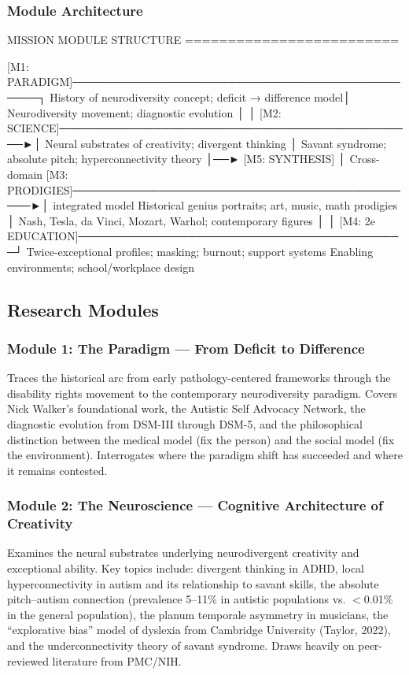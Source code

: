 \documentclass[11pt,letterpaper]{article}
\begin{document}
\subsubsection{Module Architecture}

\begin{asciibox}
MISSION MODULE STRUCTURE
=========================

  [M1: PARADIGM]──────────────────────────────────────────────┐
  History of neurodiversity concept; deficit → difference model│
  Neurodiversity movement; diagnostic evolution                │
                                                               │
  [M2: SCIENCE]──────────────────────────────────────────────►│
  Neural substrates of creativity; divergent thinking          │
  Savant syndrome; absolute pitch; hyperconnectivity theory    │──► [M5: SYNTHESIS]
                                                               │    Cross-domain
  [M3: PRODIGIES]─────────────────────────────────────────────►│    integrated model
  Historical genius portraits; art, music, math prodigies      │
  Nash, Tesla, da Vinci, Mozart, Warhol; contemporary figures  │
                                                               │
  [M4: 2e EDUCATION]──────────────────────────────────────────┘
  Twice-exceptional profiles; masking; burnout; support systems
  Enabling environments; school/workplace design
\end{asciibox}

\subsection{Research Modules}

\subsubsection{Module 1: The Paradigm --- From Deficit to Difference}
Traces the historical arc from early pathology-centered frameworks through the disability rights movement to the contemporary neurodiversity paradigm. Covers Nick Walker's foundational work, the Autistic Self Advocacy Network, the diagnostic evolution from DSM-III through DSM-5, and the philosophical distinction between the medical model (fix the person) and the social model (fix the environment). Interrogates where the paradigm shift has succeeded and where it remains contested.

\subsubsection{Module 2: The Neuroscience --- Cognitive Architecture of Creativity}
Examines the neural substrates underlying neurodivergent creativity and exceptional ability. Key topics include: divergent thinking in ADHD, local hyperconnectivity in autism and its relationship to savant skills, the absolute pitch--autism connection (prevalence 5--11\% in autistic populations vs. $<$0.01\% in the general population), the planum temporale asymmetry in musicians, the ``explorative bias'' model of dyslexia from Cambridge University (Taylor, 2022), and the underconnectivity theory of savant syndrome. Draws heavily on peer-reviewed literature from PMC/NIH.
\end{document}
